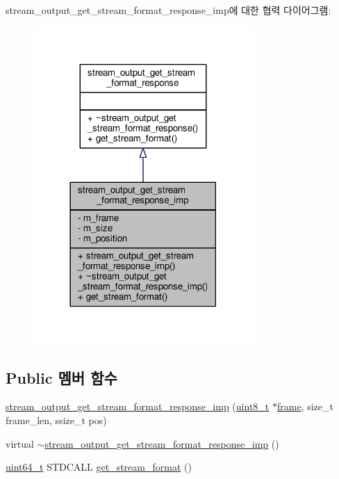 stream\+\_\+output\+\_\+get\+\_\+stream\+\_\+format\+\_\+response\+\_\+imp에 대한 협력 다이어그램\+:
\nopagebreak
\begin{figure}[H]
\begin{center}
\leavevmode
\includegraphics[width=237pt]{classavdecc__lib_1_1stream__output__get__stream__format__response__imp__coll__graph}
\end{center}
\end{figure}
\subsection*{Public 멤버 함수}
\begin{DoxyCompactItemize}
\item 
\hyperlink{classavdecc__lib_1_1stream__output__get__stream__format__response__imp_aec0935d01c27b6fa7c896a14a2b38dce}{stream\+\_\+output\+\_\+get\+\_\+stream\+\_\+format\+\_\+response\+\_\+imp} (\hyperlink{stdint_8h_aba7bc1797add20fe3efdf37ced1182c5}{uint8\+\_\+t} $\ast$\hyperlink{gst__avb__playbin_8c_ac8e710e0b5e994c0545d75d69868c6f0}{frame}, size\+\_\+t frame\+\_\+len, ssize\+\_\+t pos)
\item 
virtual \hyperlink{classavdecc__lib_1_1stream__output__get__stream__format__response__imp_a2a2b1e83172490da9bc092264ac75f8d}{$\sim$stream\+\_\+output\+\_\+get\+\_\+stream\+\_\+format\+\_\+response\+\_\+imp} ()
\item 
\hyperlink{parse_8c_aec6fcb673ff035718c238c8c9d544c47}{uint64\+\_\+t} S\+T\+D\+C\+A\+LL \hyperlink{classavdecc__lib_1_1stream__output__get__stream__format__response__imp_a853524daa61b51c7cba18fbb01bc078e}{get\+\_\+stream\+\_\+format} ()
\end{DoxyCompactItemize}
